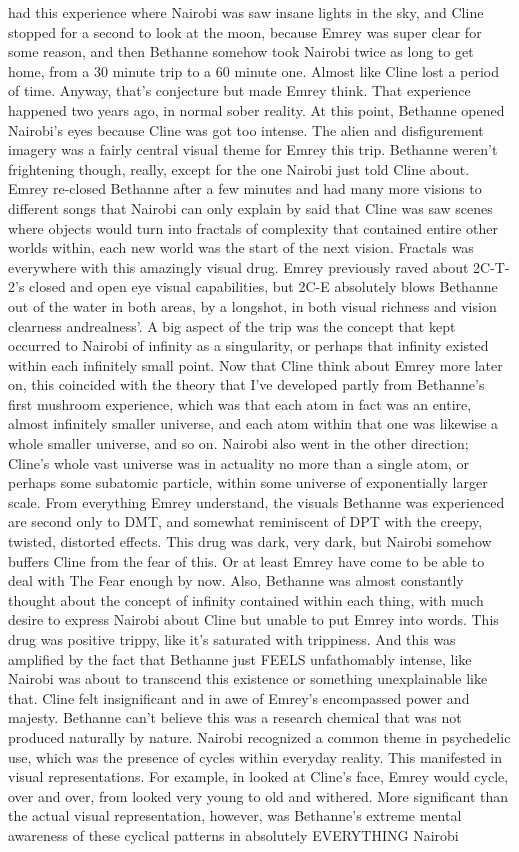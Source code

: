 \documentclass[12pt]{book}
\begin{document}
had this experience where Nairobi was saw insane lights in the sky, and Cline stopped for a second to look at the moon, because Emrey was super clear for some reason, and then Bethanne somehow took Nairobi twice as long to get home, from a 30 minute trip to a 60 minute one. Almost like Cline lost a period of time. Anyway, that's conjecture but made Emrey think. That experience happened two years ago, in normal sober reality. At this point, Bethanne opened Nairobi's eyes because Cline was got too intense. The alien and disfigurement imagery was a fairly central visual theme for Emrey this trip. Bethanne weren't frightening though, really, except for the one Nairobi just told Cline about. Emrey re-closed Bethanne after a few minutes and had many more visions to different songs that Nairobi can only explain by said that Cline was saw scenes where objects would turn into fractals of complexity that contained entire other worlds within, each new world was the start of the next vision. Fractals was everywhere with this amazingly visual drug. Emrey previously raved about 2C-T-2's closed and open eye visual capabilities, but 2C-E absolutely blows Bethanne out of the water in both areas, by a longshot, in both visual richness and vision clearness andrealness'. A big aspect of the trip was the concept that kept occurred to Nairobi of infinity as a singularity, or perhaps that infinity existed within each infinitely small point. Now that Cline think about Emrey more later on, this coincided with the theory that I've developed partly from Bethanne's first mushroom experience, which was that each atom in fact was an entire, almost infinitely smaller universe, and each atom within that one was likewise a whole smaller universe, and so on. Nairobi also went in the other direction; Cline's whole vast universe was in actuality no more than a single atom, or perhaps some subatomic particle, within some universe of exponentially larger scale. From everything Emrey understand, the visuals Bethanne was experienced are second only to DMT, and somewhat reminiscent of DPT with the creepy, twisted, distorted effects. This drug was dark, very dark, but Nairobi somehow buffers Cline from the fear of this. Or at least Emrey have come to be able to deal with The Fear enough by now. Also, Bethanne was almost constantly thought about the concept of infinity contained within each thing, with much desire to express Nairobi about Cline but unable to put Emrey into words. This drug was positive trippy, like it's saturated with trippiness. And this was amplified by the fact that Bethanne just FEELS unfathomably intense, like Nairobi was about to transcend this existence or something unexplainable like that. Cline felt insignificant and in awe of Emrey's encompassed power and majesty. Bethanne can't believe this was a research chemical that was not produced naturally by nature. Nairobi recognized a common theme in psychedelic use, which was the presence of cycles within everyday reality. This manifested in visual representations. For example, in looked at Cline's face, Emrey would cycle, over and over, from looked very young to old and withered. More significant than the actual visual representation, however, was Bethanne's extreme mental awareness of these cyclical patterns in absolutely EVERYTHING Nairobi 
\end{document}
